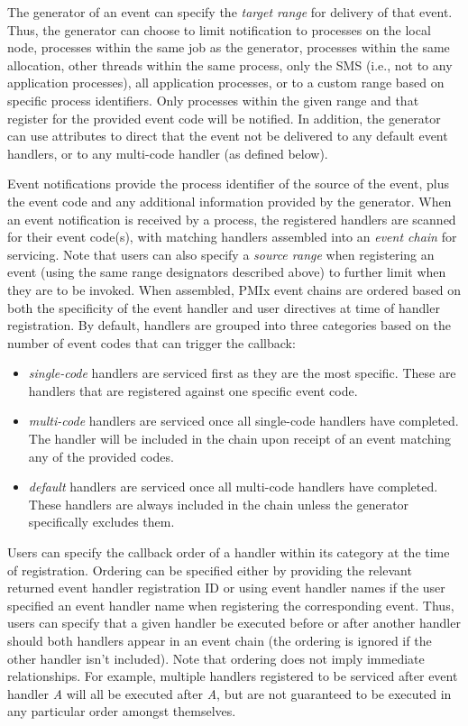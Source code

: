The generator of an event can specify the \textit{target range} for delivery of that event. Thus, the generator can choose to limit notification to processes on the local node, processes within the same job as the generator, processes within the same allocation, other threads within the same process, only the \ac{SMS} (i.e., not to any application processes), all application processes, or to a custom range based on specific process identifiers. Only processes within the given range and that register for the provided event code will be notified. In addition, the generator can use attributes to direct that the event not be delivered to any default event handlers, or to any multi-code handler (as defined below).

Event notifications provide the process identifier of the source of the event, plus the event code and any additional information provided by the generator. When an event notification is received by a process, the registered handlers are scanned for their event code(s), with matching handlers assembled into an \textit{event chain} for servicing. Note that users can also specify a \textit{source range} when registering an event (using the same range designators described above) to further limit when they are to be invoked. When assembled, PMIx event chains are ordered based on both the specificity of the event handler and user directives at time of handler registration. By default, handlers are grouped into three categories based on the number of event codes that can trigger the callback:
\begin{itemize}
\item \textit{single-code} handlers are serviced first as they are the most specific. These are handlers that are registered against one specific event code.

\item \textit{multi-code} handlers are serviced once all single-code handlers have completed. The handler will be included in the chain upon receipt of an event matching any of the provided codes.

\item \textit{default} handlers are serviced once all multi-code handlers have completed. These handlers are always included in the chain unless the generator specifically excludes them.
\end{itemize}

Users can specify the callback order of a handler within its category at the time of registration. Ordering can be specified either by providing the relevant returned event handler registration ID or using event handler names if the user specified an event handler name when registering the corresponding event. Thus, users can specify that a given handler be executed before or after another handler should both handlers appear in an event chain (the ordering is ignored if the other handler isn't included). Note that ordering does not imply immediate relationships. For example, multiple handlers registered to be serviced after event handler \textit{A} will all be executed after \textit{A}, but are not guaranteed to be executed in any particular order amongst themselves.

